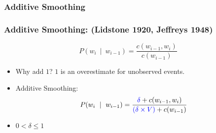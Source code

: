 \subsubsection{Additive Smoothing}

\begin{frame}
\frametitle{Additive Smoothing: (Lidstone 1920, Jeffreys 1948)} 
\[ P(w_i~\mid~w_{i-1}) = \frac{ c(w_{i-1},w_i) } { c(w_{i-1}) } \]
\begin{itemize}[<+->]
\item Why add $1$? $1$ is an overestimate for unobserved events.
\item Additive Smoothing:
\[ P(w_i~\mid~w_{i-1}) = \frac{ {\color{blue}{\delta}} + c(w_{i-1},w_i) } { {\color{blue}{(\delta \times V)}} + c(w_{i-1}) } \]
\item $0 < \delta \leq 1$
\end{itemize}
\end{frame}

